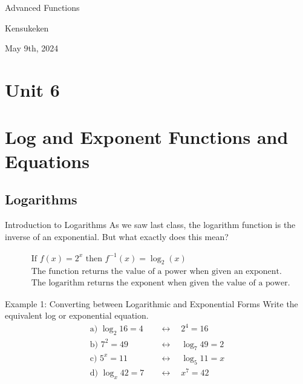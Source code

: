 \documentclass{article}
\begin{document}
\begin{titlepage}
    \centering
    \vspace*{2cm}
    {\LARGE \textcolor{lessoncolor}{Advanced Functions}}\par
    \vspace{1cm}
    {\large Kensukeken}\par
    \vspace{2cm}
    {\large May 9th, 2024}\par
    \vspace{3cm}
\end{titlepage}
\tableofcontents
\newpage
\section{Unit 6}
\section{Log and Exponent Functions and Equations}
\subsection{Logarithms}

\begin{lessonbox}{Introduction to Logarithms}
As we saw last class, the logarithm function is the inverse of an exponential. But what exactly does this mean?

\[
\begin{aligned}
    &\text{If } f(x) = 2^x \text{ then } f^{-1}(x) = \log_2(x)\\
    &\text{The function returns the value of a power when given an exponent.}\\
    &\text{The logarithm returns the exponent when given the value of a power.}
\end{aligned}
\]
\end{lessonbox}

\begin{examplebox}{Example 1: Converting between Logarithmic and Exponential Forms}
Write the equivalent log or exponential equation.
\begin{align*}
    \text{a) } \log_2{16} = 4 &\quad \leftrightarrow \quad 2^4 = 16\\
    \text{b) } 7^2 = 49 &\quad \leftrightarrow \quad \log_7{49} = 2\\
    \text{c) } 5^x = 11 &\quad \leftrightarrow \quad \log_5{11} = x\\
    \text{d) } \log_x{42} = 7 &\quad \leftrightarrow \quad x^7 = 42
\end{align*}
\end{examplebox}
\end{document}
